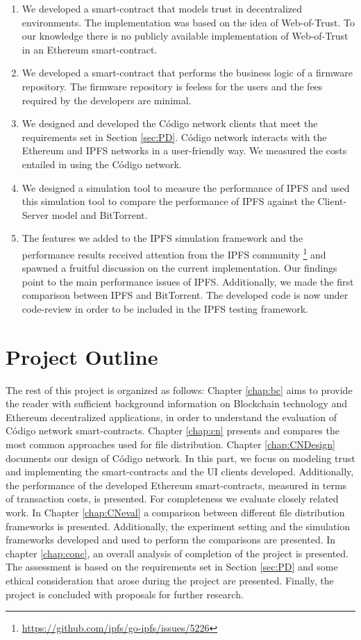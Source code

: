 {{\begin{enumerate}
    \item We developed a smart-contract that models trust in decentralized environments. The implementation was based on the idea of Web-of-Trust. To our knowledge there is no publicly available implementation of Web-of-Trust in an Ethereum smart-contract.
    \item We developed a smart-contract that performs the business logic of a firmware repository. The firmware repository is feeless for the users and the fees required by the developers are minimal.
    \item We designed and developed the Código network clients that meet the requirements set in Section \ref{sec:PD}. Código network interacts with the Ethereum and IPFS networks in a user-friendly way. We measured the costs entailed in using the Código network.
    \item We designed a simulation tool to measure the performance of IPFS and used this simulation tool to compare the performance of IPFS against the Client-Server model and BitTorrent.
    \item The  features we added to the IPFS simulation framework and the performance results received attention from the IPFS community \footnote{\url{https://github.com/ipfs/go-ipfs/issues/5226}} and spawned a fruitful discussion on the current implementation. Our findings point to the main performance issues of IPFS. Additionally, we made the first comparison between IPFS and BitTorrent. The developed code is now under code-review in order to be included in the IPFS testing framework.
\end{enumerate}

}

\section{Project Outline}{

The rest of this project is organized as follows: Chapter \ref{chap:bc} aims to provide the reader with sufficient background information on Blockchain technology and Ethereum decentralized applications, in order to understand the evaluation of Código network smart-contracts.  Chapter \ref{chap:cn} presents and compares the most common approaches used for file distribution. Chapter \ref{chap:CNDesign} documents our design of Código network. In this part, we focus on modeling trust and implementing the smart-contracts and the UI clients developed. Additionally, the performance of the developed Ethereum smart-contracts, measured in terms of transaction costs, is presented. For completeness we evaluate closely related work. In Chapter \ref{chap:CNeval} a comparison between different file distribution frameworks is presented. Additionally, the experiment setting and the simulation frameworks developed and used to perform the comparisons are presented. In chapter \ref{chap:conc}, an overall analysis of completion of the project is presented. The assessment is based on the requirements set in Section \ref{sec:PD} and some ethical consideration that arose during the project are presented. Finally, the project is concluded with proposals for further research.

}

}
